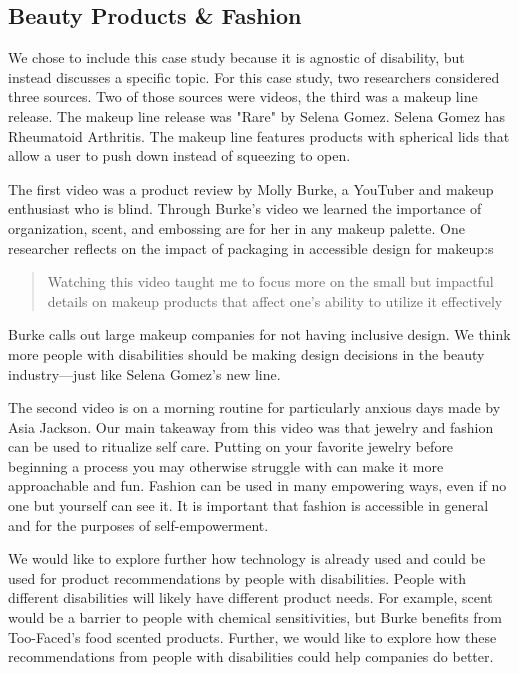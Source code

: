 \subsection{Beauty Products \& Fashion}
We chose to include this case study because it is agnostic of disability, but instead discusses a specific topic. For this case study, two researchers considered three sources. Two of those sources were videos, the third was a makeup line release. The makeup line release was "Rare" by Selena Gomez. Selena Gomez has Rheumatoid Arthritis. The makeup line features products with spherical lids that allow a user to push down instead of squeezing to open. 

The first video was a product review by Molly Burke, a YouTuber and makeup enthusiast who is blind. Through Burke's video we learned the importance of organization, scent, and embossing are for her in any makeup palette. One researcher reflects on the impact of packaging in accessible design for makeup:s
\begin{quote}
    Watching this video taught me to focus more on the small but impactful details on makeup products that affect one’s ability to utilize it effectively
\end{quote}

Burke calls out large makeup companies for not having inclusive design. We think more people with disabilities should be making design decisions in the beauty industry—just like Selena Gomez's new line. 

The second video is on a morning routine for particularly anxious days made by Asia Jackson. Our main takeaway from this video was that jewelry and fashion can be used to ritualize self care. Putting on your favorite jewelry before beginning a process you may otherwise struggle with can make it more approachable and fun. Fashion can be used in many empowering ways, even if no one but yourself can see it. It is important that fashion is accessible in general and for the purposes of self-empowerment.


We would like to explore further how technology is already used and could be used for product recommendations by people with disabilities. People with different disabilities will likely have different product needs. For example, scent would be a barrier to people with chemical sensitivities, but Burke benefits from Too-Faced's food scented products. Further, we would like to explore how these recommendations from people with disabilities could help companies do better. 


